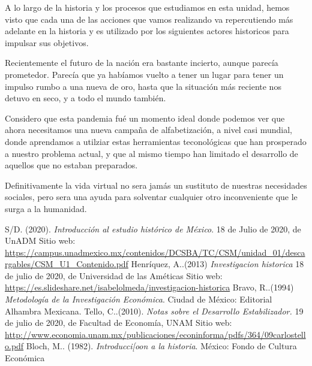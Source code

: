 \documentclass[12pt]{article}
\begin{document}
	\par A lo largo de la historia y los procesos que estudiamos en esta unidad, hemos visto que cada una de las acciones que vamos realizando va repercutiendo m\'as adelante en la historia y es utilizado por los siguientes actores historicos para impulsar sus objetivos.
	\par Recientemente el futuro de la naci\'on era bastante incierto, aunque parec\'ia prometedor. Parec\'ia que ya hab\'iamos vuelto a tener un lugar para tener un impulso rumbo a una nueva de oro, hasta que la situaci\'on m\'as reciente nos detuvo en seco, y a todo el mundo tambi\'en.
	\par Considero que esta pandemia fu\'e un momento ideal donde podemos ver que ahora necesitamos una nueva campa\~na de alfabetizaci\'on, a nivel casi mundial, donde aprendamos a utilziar estas herramientas teconol\'ogicas que han prosperado a nuestro problema actual, y que al mismo tiempo han limitado el desarrollo de aquellos que no estaban preparados. 
	\par Definitivamente la vida virtual no sera jam\'as un sustituto de nuestras necesidades sociales, pero sera una ayuda para solventar cualquier otro inconveniente que le surga a la humanidad.

\newpage
\begin{thebibliography}{X}
	 S/D. (2020). \textit{Introducción al estudio histórico de México}. 18 de Julio de 2020, de UnADM Sitio web: \url{https://campus.unadmexico.mx/contenidos/DCSBA/TC/CSM/unidad_01/descargables/CSM_U1_Contenido.pdf}
	 Henr\'iquez, A..(2013) \textit{Investigacion historica} 18 de julio de 2020, de Universidad de las Améticas Sitio web: \url{https://es.slideshare.net/isabelolmeda/investigacion-historica}
	 Bravo, R..(1994) \textit{Metodología de la Investigación Económica}. Ciudad de México: Editorial Alhambra Mexicana.
	 Tello, C..(2010). \textit{Notas sobre el Desarrollo Estabilizador.} 19 de julio de 2020, de Facultad de Economía, UNAM Sitio web: \url{http://www.economia.unam.mx/publicaciones/econinforma/pdfs/364/09carlostello.pdf}
	 Bloch, M.. (1982). \textit{Introducci[oon a la historia}. M\'exico: Fondo de Cultura Econ\'omica

\end{thebibliography}
\end{document}
